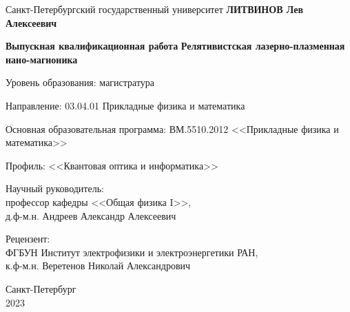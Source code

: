 \begin{titlepage}
    \begin{center} 
        
        
        Санкт-Петербургский государственный университет
        \vfill
        \textbf{ЛИТВИНОВ Лев Алексеевич}

        \textbf{Выпускная квалификационная работа}
        \vfill
        {\large\textbf{Релятивистская лазерно-плазменная нано-магноника}}
        \vfill
        {
            Уровень образования: магистратура

            Направление: 03.04.01 Прикладные физика и математика

            Основная образовательная программа: ВМ.5510.2012 <<Прикладные физика и математика>>

            Профиль: <<Квантовая оптика и информатика>>
        }

        \vfill
        
        \hfill
        \begin{minipage}{0.5\textwidth}
            \begin{flushright}
                Научный руководитель:\\ профессор кафедры <<Общая физика I>>,\\д.ф-м.н. Андреев Александр Алексеевич
            \end{flushright}
        \end{minipage}

        \vfill

        \hfill
        \begin{minipage}{0.5\textwidth}
            \begin{flushright}
                Рецензент:\\ ФГБУН Институт электрофизики и электроэнергетики РАН,\\к.ф-м.н. Веретенов Николай Александрович
            \end{flushright}
        \end{minipage}
        
        
        \vfill\vfill\vfill
        
        {Санкт-Петербург \\ 2023}
        
    \end{center}
\end{titlepage}